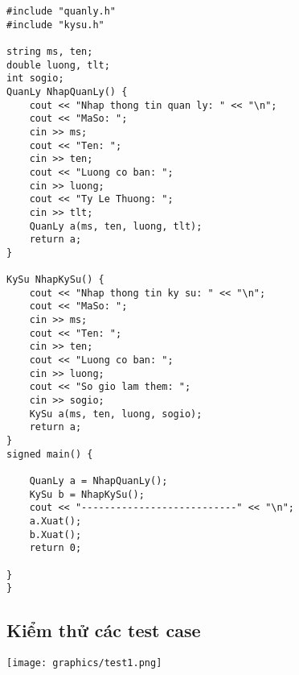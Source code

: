 \begin{verbatim} 
#include "quanly.h"
#include "kysu.h"

string ms, ten;
double luong, tlt;
int sogio;
QuanLy NhapQuanLy() {
    cout << "Nhap thong tin quan ly: " << "\n";
    cout << "MaSo: "; 
    cin >> ms;
    cout << "Ten: ";
    cin >> ten;
    cout << "Luong co ban: ";
    cin >> luong;
    cout << "Ty Le Thuong: ";
    cin >> tlt;
    QuanLy a(ms, ten, luong, tlt);
    return a;
}

KySu NhapKySu() {
    cout << "Nhap thong tin ky su: " << "\n";
    cout << "MaSo: "; 
    cin >> ms;
    cout << "Ten: ";
    cin >> ten;
    cout << "Luong co ban: ";
    cin >> luong;
    cout << "So gio lam them: ";
    cin >> sogio;
    KySu a(ms, ten, luong, sogio);
    return a;
}
signed main() {

    QuanLy a = NhapQuanLy();
    KySu b = NhapKySu();
    cout << "---------------------------" << "\n";
    a.Xuat();
    b.Xuat();    
    return 0;

}
}
\end{verbatim}
\subsection{Kiểm thử các test case}
\texttt{[image: graphics/test1.png]}
